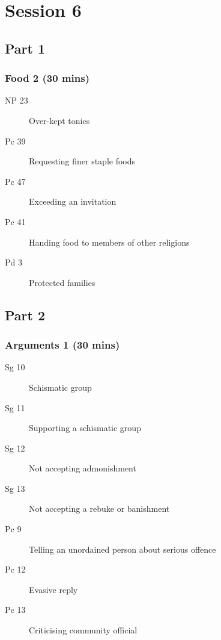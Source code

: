 \documentclass[11pt,oneside]{memoir}
\begin{document}
\chapter{Session 6}

\begin{multicols}{2}

\section{Part 1}

\subsection{Food 2 (30 mins)}

\begin{description}
\item[NP 23] Over-kept tonics
\item[Pc 39] Requesting finer staple foods
\item[Pc 47] Exceeding an invitation
\item[Pc 41] Handing food to members of other religions
\item[Pd 3] Protected families
\end{description}

\columnbreak

\section{Part 2}

\subsection{Arguments 1 (30 mins)}

\begin{description}
\item[Sg 10] Schismatic group
\item[Sg 11] Supporting a schismatic group
\item[Sg 12] Not accepting admonishment
\item[Sg 13] Not accepting a rebuke or banishment
\item[Pc 9] Telling an unordained person about serious offence
\item[Pc 12] Evasive reply
\item[Pc 13] Criticising community official
\end{description}

\end{multicols}
\end{document}

